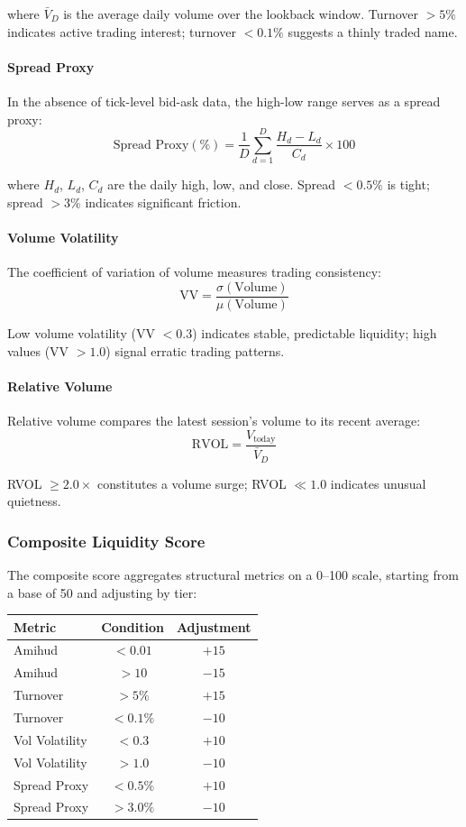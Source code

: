where $\bar{V}_D$ is the average daily volume over the lookback window. Turnover $> 5\%$ indicates active trading interest; turnover $< 0.1\%$ suggests a thinly traded name.

\paragraph{Spread Proxy}

In the absence of tick-level bid-ask data, the high-low range serves as a spread proxy:
\[
\text{Spread Proxy}(\%) = \frac{1}{D} \sum_{d=1}^{D} \frac{H_d - L_d}{C_d} \times 100
\]

where $H_d$, $L_d$, $C_d$ are the daily high, low, and close. Spread $< 0.5\%$ is tight; spread $> 3\%$ indicates significant friction.

\paragraph{Volume Volatility}

The coefficient of variation of volume measures trading consistency:
\[
\text{VV} = \frac{\sigma(\text{Volume})}{\mu(\text{Volume})}
\]

Low volume volatility (VV $< 0.3$) indicates stable, predictable liquidity; high values (VV $> 1.0$) signal erratic trading patterns.

\paragraph{Relative Volume}

Relative volume compares the latest session's volume to its recent average:
\[
\text{RVOL} = \frac{V_{\text{today}}}{\bar{V}_{D}}
\]

RVOL $\geq 2.0\times$ constitutes a volume surge; RVOL $\ll 1.0$ indicates unusual quietness.

\subsubsection{Composite Liquidity Score}

The composite score aggregates structural metrics on a 0--100 scale, starting from a base of 50 and adjusting by tier:

\begin{center}
\begin{tabular}{lcc}
\textbf{Metric} & \textbf{Condition} & \textbf{Adjustment} \\
\hline
Amihud & $< 0.01$ & $+15$ \\
Amihud & $> 10$ & $-15$ \\
Turnover & $> 5\%$ & $+15$ \\
Turnover & $< 0.1\%$ & $-10$ \\
Vol Volatility & $< 0.3$ & $+10$ \\
Vol Volatility & $> 1.0$ & $-10$ \\
Spread Proxy & $< 0.5\%$ & $+10$ \\
Spread Proxy & $> 3.0\%$ & $-10$ \\
\end{tabular}
\end{center}

